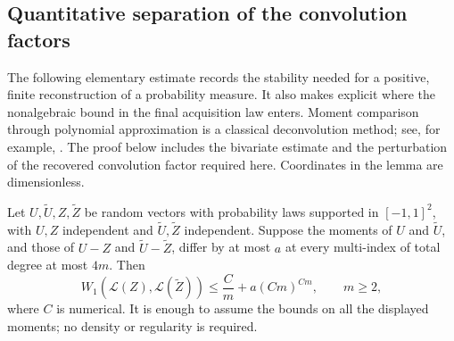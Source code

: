 \subsection{Quantitative separation of the convolution factors}
The following elementary estimate records the stability needed for
a positive, finite reconstruction of a probability measure.  It also
makes explicit where the nonalgebraic bound in the final acquisition
law enters.  Moment comparison through polynomial approximation is a
classical deconvolution method; see, for example,
\cite[Section~2.3]{RigolletWeed}.  The proof below includes the
bivariate estimate and the perturbation of the recovered convolution
factor required here.  Coordinates in the lemma are dimensionless.

\begin{lemma}
\label{lem:two-field-moment-separation}
Let $U,\widetilde U,Z,\widetilde Z$ be random vectors with probability
laws supported in $[-1,1]^2$, with $U,Z$ independent and
$\widetilde U,\widetilde Z$ independent.  Suppose the moments of
$U$ and $\widetilde U$, and those of $U-Z$ and
$\widetilde U-\widetilde Z$, differ by at most $a$ at every
multi-index of total degree at most $4m$.  Then
\begin{equation}\label{eq:two-field-moment-stability}
 W_1(\mathcal L(Z),\mathcal L(\widetilde Z))
       \le \frac{C}{m}+a(Cm)^{Cm},\qquad m\ge2,
\end{equation}
where $C$ is numerical.  It is enough to assume the bounds on all
the displayed moments; no density or regularity is required.
\end{lemma}
